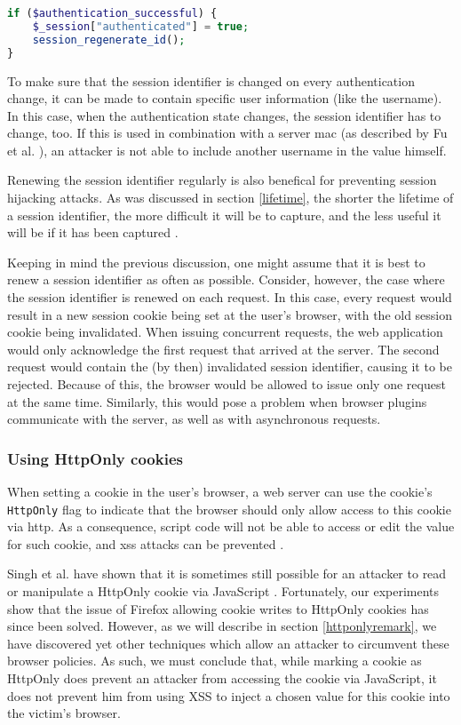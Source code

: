 \begin{lstlisting}[language=PHP]
if ($authentication_successful) {
    $_session["authenticated"] = true;
    session_regenerate_id();
}
\end{lstlisting}

To make sure that the session identifier is changed on every authentication change, it can be made to contain specific user information (like the username). In this case, when the authentication state changes, the session identifier has to change, too. If this is used in combination with a server \gls{mac} (as described by Fu et al. \cite{Fu2001}), an attacker is not able to include another username in the value himself.

Renewing the session identifier regularly is also benefical for preventing session hijacking attacks. As was discussed in section \ref{lifetime}, the shorter the lifetime of a session identifier, the more difficult it will be to capture, and the less useful it will be if it has been captured \cite{Fu2001}.

Keeping in mind the previous discussion, one might assume that it is best to renew a session identifier as often as possible. Consider, however, the case where the session identifier is renewed on each request. In this case, every request would result in a new session cookie being set at the user's browser, with the old session cookie being invalidated. When issuing concurrent requests, the web application would only acknowledge the first request that arrived at the server. The second request would contain the (by then) invalidated session identifier, causing it to be rejected. Because of this, the browser would be allowed to issue only one request at the same time. Similarly, this would pose a problem when browser plugins communicate with the server, as well as with asynchronous requests.

\subsubsection{Using HttpOnly cookies}\label{httponly}

When setting a cookie in the user's browser, a web server can use the cookie's \texttt{HttpOnly} flag to indicate that the browser should only allow access to this cookie via \gls{http}. As a consequence, script code will not be able to access or edit the value for such cookie, and \gls{xss} attacks can be prevented \cite{HttpOnly}.

Singh et al. have shown that it is sometimes still possible for an attacker to read or manipulate a HttpOnly cookie via JavaScript \cite{Singh2010}. Fortunately, our experiments show that the issue of Firefox allowing cookie writes to HttpOnly cookies has since been solved. However, as we will describe in section \ref{httponlyremark}, we have discovered yet other techniques which allow an attacker to circumvent these browser policies. As such, we must conclude that, while marking a cookie as HttpOnly does prevent an attacker from accessing the cookie via JavaScript, it does not prevent him from using XSS to inject a chosen value for this cookie into the victim's browser.

